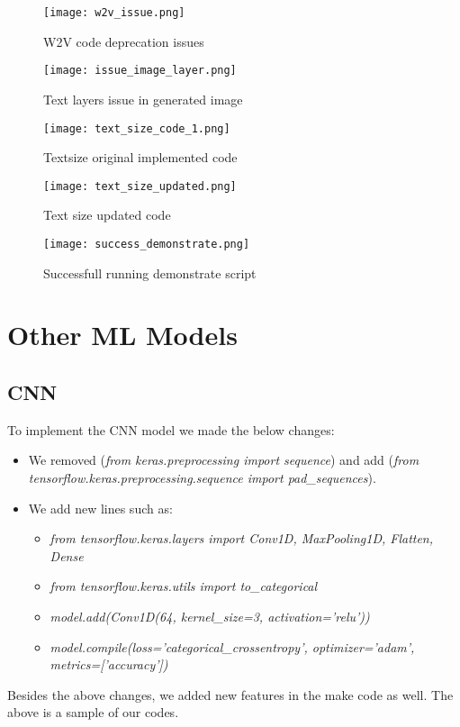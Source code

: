  \begin{figure}[H]
    \centering
    \texttt{[image: w2v\_issue.png]}
    \caption{W2V code deprecation issues}
    \label{fig:W2V_issue}
\end{figure}
\begin{figure}[H]
    \centering
    \texttt{[image: issue\_image\_layer.png]}
    \caption{Text layers issue in generated image}
    \label{fig:issue_image_layer}
\end{figure}

\begin{figure}[H]
    \centering
    \texttt{[image: text\_size\_code\_1.png]}
    \caption{Textsize original implemented code}
    \label{fig:text_size_prob_code}
\end{figure}
\begin{figure}[H]
    \centering
    \texttt{[image: text\_size\_updated.png]}
    \caption{Text size updated code}
    \label{fig:text_size_updated}
\end{figure}

\begin{figure}[H]
    \centering
    \texttt{[image: success\_demonstrate.png]}
    \caption{Successfull running demonstrate script}
    \label{fig:succees_demonstrate}
\end{figure}


\section{Other ML Models}
\subsection{CNN}
To implement the CNN model we made the below changes:
\begin{itemize}
    \item We removed (\textit{from keras.preprocessing import sequence}) and add (\textit{from tensorflow.keras.preprocessing.sequence import pad\_sequences}).
    \item We add new lines such as:
        \begin{itemize}
            \item \textit{from tensorflow.keras.layers import Conv1D, MaxPooling1D, Flatten, Dense}
            \item \textit{from tensorflow.keras.utils import to\_categorical}
            \item \textit{model.add(Conv1D(64, kernel\_size=3, activation='relu'))}
            \item \textit{model.compile(loss='categorical\_crossentropy', optimizer='adam', metrics=['accuracy'])}
        \end{itemize}
\end{itemize}
Besides the above changes, we added new features in the make code as well. The above is a sample of our codes. 
